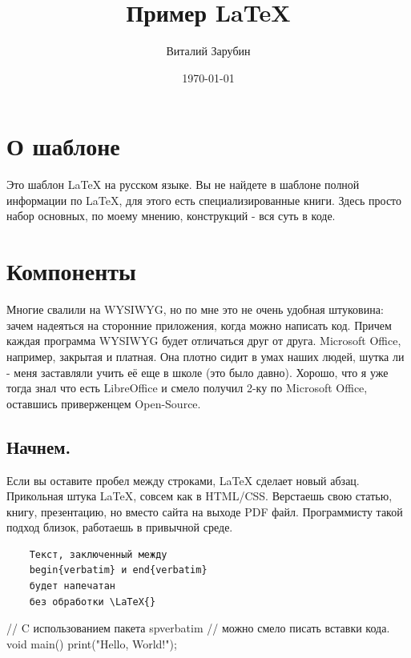\documentclass{article}
\author{Виталий Зарубин}
\title{Пример \LaTeX{}}
\date{\today}
\begin{document}

    \maketitle

    \newpage
    \section*{О шаблоне}

    Это шаблон \LaTeX{} на русском языке.
    Вы не найдете в шаблоне полной информации по \LaTeX{}, для этого есть специализированные книги.
    Здесь просто набор основных, по моему мнению, конструкций - вся суть в коде.

    \newpage
    \section{Компоненты}

    Многие свалили на WYSIWYG, но по мне это не очень удобная штуковина: зачем надеяться на сторонние приложения, когда можно написать код.
    Причем каждая программа WYSIWYG будет отличаться друг от друга.
    Microsoft Office, например, закрытая и платная.
    Она плотно сидит в умах наших людей, шутка ли - меня заставляли учить её еще в школе (это было давно).
    Хорошо, что я уже тогда знал что есть LibreOffice и смело получил 2-ку по Microsoft Office, оставшись приверженцем Open-Source.

    \subsection*{Начнем.}

    Если вы оставите пробел между строками, \LaTeX{} сделает новый абзац.
    Прикольная штука \LaTeX{}, совсем как в HTML/CSS.
    Верстаешь свою статью, книгу, презентацию, но вместо сайта на выходе PDF файл.
    Программисту такой подход близок, работаешь в привычной среде.

    \begin{verbatim}
    Текст, заключенный между
    begin{verbatim} и end{verbatim}
    будет напечатан
    без обработки \LaTeX{}
    \end{verbatim}

    \begin{spverbatim}
    // C использованием пакета spverbatim
    // можно смело писать вставки кода.
    void main() {
        print("Hello, World!");
    }
    \end{spverbatim}
\end{document}
